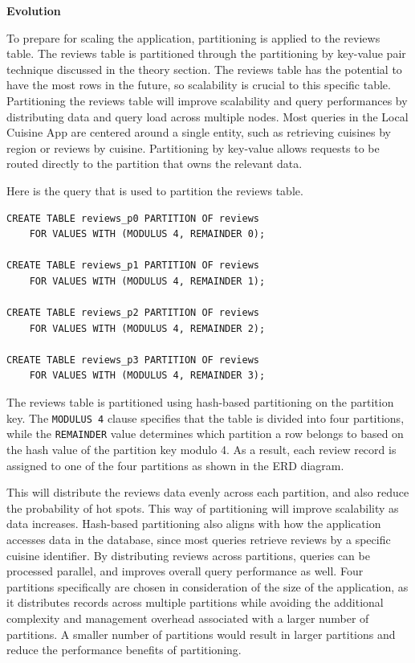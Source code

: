 \noindent \textbf{Evolution}

To prepare for scaling the application, partitioning is applied to the reviews table.
The reviews table is partitioned through the partitioning by key-value pair technique discussed in the theory section.
The reviews table has the potential to have the most rows in the future, so scalability is crucial to this specific table.
Partitioning the reviews table will improve scalability and query performances by distributing data and query load across multiple nodes.
Most queries in the Local Cuisine App are centered around a single entity, such as retrieving cuisines by region or reviews by cuisine.
Partitioning by key-value allows requests to be routed directly to the partition that owns the relevant data.

Here is the query that is used to partition the reviews table. 

\begin{verbatim}
CREATE TABLE reviews_p0 PARTITION OF reviews
    FOR VALUES WITH (MODULUS 4, REMAINDER 0);

CREATE TABLE reviews_p1 PARTITION OF reviews
    FOR VALUES WITH (MODULUS 4, REMAINDER 1);

CREATE TABLE reviews_p2 PARTITION OF reviews
    FOR VALUES WITH (MODULUS 4, REMAINDER 2);

CREATE TABLE reviews_p3 PARTITION OF reviews
    FOR VALUES WITH (MODULUS 4, REMAINDER 3);
\end{verbatim}

The reviews table is partitioned using hash-based partitioning on the partition key. The \texttt{MODULUS 4} clause specifies that the table is divided into four partitions,
while the \texttt{REMAINDER} value determines which partition a row belongs to based on the hash value of the partition key modulo 4.
As a result, each review record is assigned to one of the four partitions as shown in the ERD diagram.

This will distribute the reviews data evenly across each partition, and also reduce the probability of hot spots. This way of partitioning will improve
scalability as data increases.
Hash-based partitioning also aligns with how the application accesses data in the database, since most queries retrieve reviews by a specific cuisine identifier.
By distributing reviews across partitions, queries can be processed parallel, and improves overall query performance as well.
Four partitions specifically are chosen in consideration of the size of the application,
as it distributes records across multiple partitions while avoiding the additional complexity and management overhead associated with a larger number of partitions.
A smaller number of partitions would result in larger partitions and reduce the performance benefits of partitioning.

